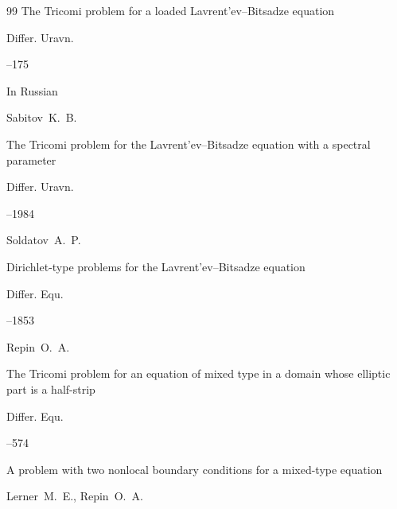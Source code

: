 \begin{thebibliography}{99}
\paper The Tricomi problem for a loaded Lavrent'ev--Bitsadze equation

\jour Differ. Uravn.




--175




\lang In Russian

\by Sabitov~K.~B.

\paper The Tricomi problem for the Lavrent'ev--Bitsadze equation with a spectral parameter

\jour Differ. Uravn.




--1984






\by Soldatov~A.~P.

\paper Dirichlet-type problems for the Lavrent'ev--Bitsadze equation

\jour Differ. Equ.




--1853





\by Repin~O.~A.

\paper The Tricomi problem for an equation of mixed type in a domain whose elliptic part is a half-strip


\jour Differ. Equ.




--574




\paper A problem with two nonlocal boundary conditions for a mixed-type equation

\by Lerner~M.~E.,  Repin~O.~A.


\end{thebibliography}
